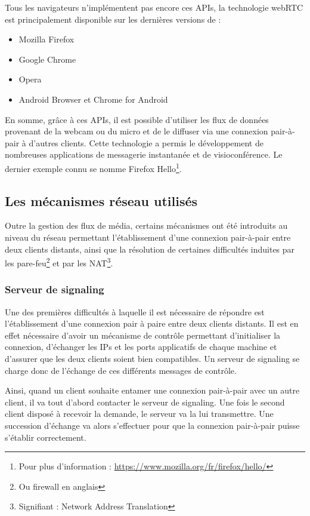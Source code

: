 \documentclass{tnreport}
\begin{document}
Tous les navigateurs n'implémentent pas encore ces APIs, la technologie webRTC est principalement disponible sur les dernières versions de :
\begin{itemize}
  \item Mozilla Firefox
  \item Google Chrome
  \item Opera
  \item Android Browser et Chrome for Android\\
\end{itemize}

En somme, grâce à ces APIs, il est possible d'utiliser les flux de données provenant de la webcam ou du micro et de le diffuser via une connexion pair-à-pair à d'autres clients. Cette technologie a permis le développement de nombreuses applications de messagerie instantanée et de visioconférence. Le dernier exemple connu se nomme Firefox Hello\footnote{Pour plus d'information : \url{https://www.mozilla.org/fr/firefox/hello/}}.

\subsection{Les mécanismes réseau utilisés}

Outre la gestion des flux de média, certains mécanismes ont été introduits au niveau du réseau permettant l'établissement d'une connexion pair-à-pair entre deux clients distants, ainsi que la résolution de certaines difficultés induites par les pare-feu\footnote{Ou firewall en anglais} et par les NAT\footnote{Signifiant : Network Address Translation}.

\subsubsection{Serveur de signaling}

Une des premières difficultés à laquelle il est nécessaire de répondre est l'établissement d'une connexion pair à paire entre deux clients distants. Il est en effet nécessaire d'avoir un mécanisme de contrôle permettant d'initialiser la connexion, d'échanger les IPs et les ports applicatifs de chaque machine et d'assurer que les deux clients soient bien compatibles. Un serveur de signaling se charge donc de l'échange de ces différents messages de contrôle. 

Ainsi, quand un client souhaite entamer une connexion pair-à-pair avec un autre client, il va tout d'abord contacter le serveur de signaling. Une fois le second client disposé à recevoir la demande, le serveur va la lui transmettre. Une succession d'échange va alors s'effectuer pour que la connexion pair-à-pair puisse s'établir correctement. 
\end{document}
